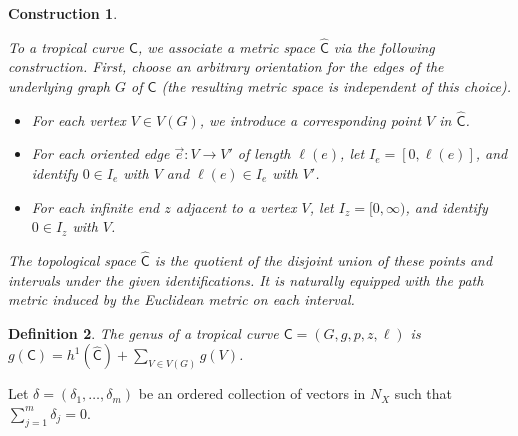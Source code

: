 \documentclass{article}
\newtheorem{definition}{Definition}[section]
\newtheorem{construction}[definition]{Construction}
\newcommand{\tropC}{\mathsf{C}}
\begin{document}
\begin{construction}\label{const: tropCmetricspace}


To a tropical curve $\tropC$, we associate a metric space $\hat{\tropC}$ via the following construction. First, choose an arbitrary orientation for the edges of the underlying graph $G$ of $\tropC$ (the resulting metric space is independent of this choice).

\begin{itemize}
    \item For each vertex $V \in V(G)$, we introduce a corresponding point $V$ in $\hat{\tropC}$.
    
    \item For each oriented edge $\vec{e}: V \to V'$ of length $\ell(e)$, let $I_e = [0, \ell(e)]$, and identify $0 \in I_e$ with $V$ and $\ell(e) \in I_e$ with $V'$.
    
    \item For each infinite end $z$ adjacent to a vertex $V$, let $I_z = [0, \infty)$, and identify $0 \in I_z$ with $V$.
\end{itemize}

The topological space $\hat{\tropC}$ is the quotient of the disjoint union of these points and intervals under the given identifications. It is naturally equipped with the path metric induced by the Euclidean metric on each interval.
\end{construction}





    \begin{definition}
        The genus of a tropical curve $\tropC = (G, g, p, z, \ell)$ is $g(\tropC) = h^1(\hat{\tropC}) + \sum_{V \in V(G)}g(V)$.
    \end{definition}
    
  
    Let $\delta=(\delta_1,\ldots,\delta_m)$ be an ordered collection of vectors in $N_X$ such that $\sum_{j=1}^m \delta_j=0$. 
    
\end{document}
